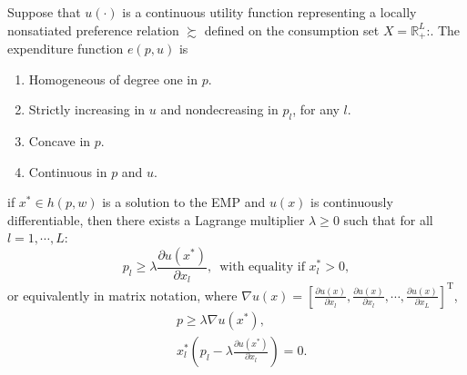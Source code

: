 \documentclass[12pt,fleqn]{book} %
\begin{document}
\begin{proposition}
Suppose that $u(\cdot)$ is a continuous utility function representing a locally nonsatiated preference relation $\succsim$ defined on the consumption set $X=\mathbb{R}_+^L$:.
The expenditure function $e(p, u)$ is
\begin{enumerate}
	\item  Homogeneous of degree one in $p$.
    \item  Strictly increasing in $u$ and nondecreasing in $p_l$, for any $l$.
	\item  Concave in $p$.
	\item  Continuous in $p$ and $u$.
\end{enumerate}


\end{proposition}


\begin{theorem}
	if $x^* \in h(p,w)$ is a solution to the EMP and $u(x)$ is continuously differentiable, then there exists a
	Lagrange multiplier $\lambda\ge0$ such that for all $l = 1,\cdots, L$:
	\[
	p_l\ge\lambda\frac{\partial u(x^*)}{\partial x_l}  ,\ \;\text{with equality if } x^*_l > 0,
	\]
	or equivalently in matrix notation, where $\nabla u(x)= \left[\frac{\partial u(x)}{\partial x_l},\frac{\partial u(x)}{\partial x_l},\cdots,\frac{\partial u(x)}{\partial x_L} \right]^\mathrm{T}$,
	\begin{align*}
	& p\ge\lambda\nabla u(x^*) , \\
	&x^*_l\left(p_l-\lambda\frac{\partial u(x^*)}{\partial x_l} \right)= 0.
	\end{align*}
\end{theorem}
\end{document}
